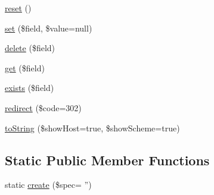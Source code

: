 \begin{DoxyCompactItemize}
\hyperlink{classTk_1_1Url_a02b0363765e3c6ee36b0391b5889d3ad}{reset} ()
\item 
\hyperlink{classTk_1_1Url_a4042fba8c6348b40a17837415d963f88}{set} (\$field, \$value=null)
\item 
\hyperlink{classTk_1_1Url_ae1b2135612b83275e34217b9037f228c}{delete} (\$field)
\item 
\hyperlink{classTk_1_1Url_a182e36fe45a774cdf129c6c51d815c10}{get} (\$field)
\item 
\hyperlink{classTk_1_1Url_a326f3491a47a18749290b53bc4c506ef}{exists} (\$field)
\item 
\hyperlink{classTk_1_1Url_a6d6be2a78d40f6fd2744d34f6e55f972}{redirect} (\$code=302)
\item 
\hyperlink{classTk_1_1Url_a237bb0fac856abeba907ee14be0a139b}{to\+String} (\$show\+Host=true, \$show\+Scheme=true)
\end{DoxyCompactItemize}
\subsection*{Static Public Member Functions}
\begin{DoxyCompactItemize}
\item 
static \hyperlink{classTk_1_1Url_a2528c20bc9d0bd6d3d31ce1d5ead1a42}{create} (\$spec= '')
\end{DoxyCompactItemize}
